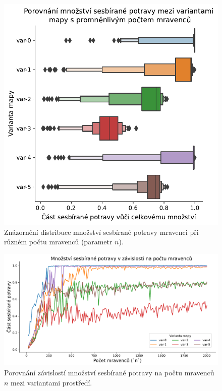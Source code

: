 \documentclass[10pt,a4paper,twocolumn]{article}
\begin{document}
\begin{figure}[tb]
  \centering
  \includegraphics[width=0.98\linewidth]{images/num_ants_variants_means.pdf}
  \caption{Znázornění distribuce množství sesbírané potravy mravenci 
  při různém počtu mravenců (parametr $n$).}
  \label{fig:num_ants_means}
\end{figure}

\begin{figure}[tb]
  \centering
  \includegraphics[width=0.98\linewidth]{images/num_ants_variants_together.pdf}
  \caption{Porovnání závislostí množství sesbírané potravy na počtu 
  mravenců $n$ mezi variantami prostředí.}
  \label{fig:num_ants_together}
\end{figure}
\end{document}
